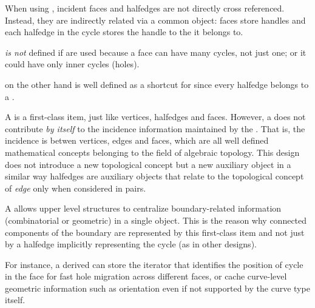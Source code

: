 {When using , incident faces and halfedges are not directly cross referenced. Instead,
they are indirectly related via a common  object: faces store 
 handles and each halfedge in the cycle stores the handle to the 
 it belongs to.

 {\em is not} defined if  are used because a face
can have many cycles, not just one; or it could have only inner cycles (holes).

 on the other hand is well defined as a shortcut for 
since every halfedge belongs to a .

A  is a first-class  item, just like vertices, halfedges and faces.
However, a  does not contribute {\em by itself} to the incidence information 
maintained by the . That is, the incidence is betwen vertices, edges and faces,
which are all well defined mathematical concepts belonging to the field of algebraic topology.
This design does not introduce a new topological concept but a new
auxiliary object in a similar way halfedges are auxiliary objects that 
relate to the topological concept of {\em edge} only when considered in pairs.

A  allows upper level structures to centralize boundary-related information
(combinatorial or geometric) in a single object. This is the reason why 
connected components of the boundary are represented by this first-class  item 
and not just by a halfedge implicitly representing the cycle (as in other designs).

For instance, a derived  can store the iterator that identifies the position of
cycle in the face for fast hole migration across different faces, or cache curve-level geometric
information such as orientation even if not supported by the curve type itself.
}

